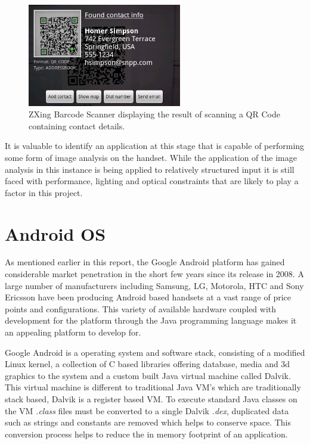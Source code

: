 \begin{figure}[h!]
\centering
    \includegraphics[width=0.6\textwidth]{research/images/zxing_barcode.jpeg}
	
	\caption[ZXing Barcode Scanner]%
    {ZXing Barcode Scanner displaying the result of scanning a QR Code containing contact details.}
	\label{zxing_scanner}
\end{figure}

It is valuable to identify an application at this stage that is capable of performing some form of image analysis on the handset. While the application of the image analysis in this instance is being applied to relatively structured input it is still faced with performance, lighting and optical constraints that are likely to play a factor in this project.

\section{Android OS}
As mentioned earlier in this report, the Google Android platform has gained considerable market penetration in the short few years since its release in 2008. A large number of manufacturers including Samsung, LG, Motorola, HTC and Sony Ericsson have been producing Android based handsets at a vast range of price points and configurations. This variety of available hardware coupled with development for the platform through the Java programming language makes it an appealing platform to develop for.

Google Android is a operating system and software stack, consisting of a modified Linux kernel, a collection of C based libraries offering database, media and 3d graphics to the system and a custom built Java virtual machine called Dalvik. This virtual machine is different to traditional Java VM’s which are traditionally stack based, Dalvik is a register based VM. To execute standard Java classes on the VM \emph{.class} files must be converted to a single Dalvik \emph{.dex}, duplicated data such as strings and constants are removed which helps to conserve space. This conversion process helps to reduce the in memory footprint of an application.

